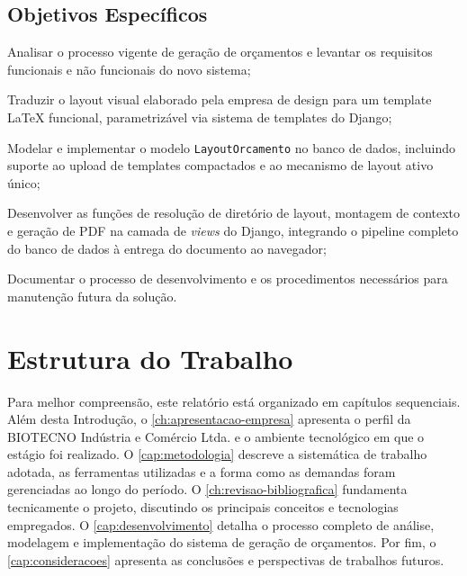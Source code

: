 \subsection{Objetivos Específicos}
\label{subsec:objetivos-especificos}

\begin{alineas}
    \item Analisar o processo vigente de geração de orçamentos e levantar os requisitos funcionais e
    não funcionais do novo sistema;
    \item Traduzir o layout visual elaborado pela empresa de design para um template \LaTeX{} funcional,
    parametrizável via sistema de templates do Django;
    \item Modelar e implementar o modelo \texttt{LayoutOrcamento} no banco de dados, incluindo suporte
    ao upload de templates compactados e ao mecanismo de layout ativo único;
    \item Desenvolver as funções de resolução de diretório de layout, montagem de contexto e geração de
    PDF na camada de \textit{views} do Django, integrando o pipeline completo do banco de dados à
    entrega do documento ao navegador;
    \item Documentar o processo de desenvolvimento e os procedimentos necessários para manutenção
    futura da solução.
\end{alineas}

\section{Estrutura do Trabalho}
\label{sec:estrutura}

Para melhor compreensão, este relatório está organizado em capítulos sequenciais. Além desta Introdução,
o \autoref{ch:apresentacao-empresa} apresenta o perfil da BIOTECNO Indústria e Comércio Ltda. e o
ambiente tecnológico em que o estágio foi realizado. O \autoref{cap:metodologia} descreve a sistemática
de trabalho adotada, as ferramentas utilizadas e a forma como as demandas foram gerenciadas ao longo do
período. O \autoref{ch:revisao-bibliografica} fundamenta tecnicamente o projeto, discutindo os principais
conceitos e tecnologias empregados. O \autoref{cap:desenvolvimento} detalha o processo completo de
análise, modelagem e implementação do sistema de geração de orçamentos. Por fim, o
\autoref{cap:consideracoes} apresenta as conclusões e perspectivas de trabalhos futuros.
